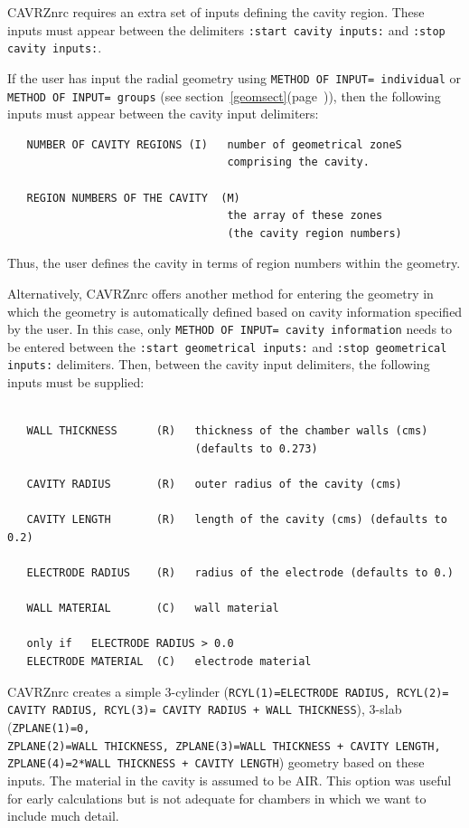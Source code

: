 \documentclass[12pt,twoside]{article}  %
\newcommand{\lpage}[1]{(page~\pageref{#1})}
\begin{document}
CAVRZnrc requires an extra set of
inputs defining the cavity region.  These inputs must appear between the
delimiters {\tt :start cavity inputs:} and {\tt :stop cavity inputs:}.

If the user has input the radial geometry using
{\tt METHOD OF INPUT= individual} or {\tt METHOD OF INPUT= groups}
(see section~\ref{geomsect}\lpage{geomsect}), then the following inputs must
appear between the cavity input delimiters:
\begin{verbatim}
   NUMBER OF CAVITY REGIONS (I)   number of geometrical zoneS
                                  comprising the cavity.

   REGION NUMBERS OF THE CAVITY  (M)
                                  the array of these zones
                                  (the cavity region numbers)
\end{verbatim}
Thus, the user defines the cavity in terms of region numbers within the
geometry.

Alternatively, CAVRZnrc offers another method for entering the geometry
in which the geometry is
automatically defined based on cavity information specified by the user.
In this case, only {\tt METHOD OF INPUT= cavity information} needs to be
entered between the {\tt :start geometrical inputs:} and
{\tt :stop geometrical inputs:} delimiters.  Then, between the
cavity input delimiters, the following inputs must be supplied:

\begin{verbatim}

   WALL THICKNESS      (R)   thickness of the chamber walls (cms)
                             (defaults to 0.273)

   CAVITY RADIUS       (R)   outer radius of the cavity (cms)

   CAVITY LENGTH       (R)   length of the cavity (cms) (defaults to 0.2)

   ELECTRODE RADIUS    (R)   radius of the electrode (defaults to 0.)

   WALL MATERIAL       (C)   wall material

   only if   ELECTRODE RADIUS > 0.0
   ELECTRODE MATERIAL  (C)   electrode material
\end{verbatim}
CAVRZnrc creates a simple 3-cylinder
({\tt RCYL(1)=ELECTRODE RADIUS, RCYL(2)=\\CAVITY RADIUS, RCYL(3)=
CAVITY RADIUS + WALL THICKNESS}), 3-slab ({\tt ZPLANE(1)=0,\\
ZPLANE(2)=WALL THICKNESS, ZPLANE(3)=WALL THICKNESS + CAVITY LENGTH,\\
ZPLANE(4)=2*WALL THICKNESS + CAVITY LENGTH}) geometry based on these
inputs.  The material in the cavity is assumed to be AIR.  This option was
useful for early calculations but is not adequate for chambers in which we
want to include much detail.
\end{document}
